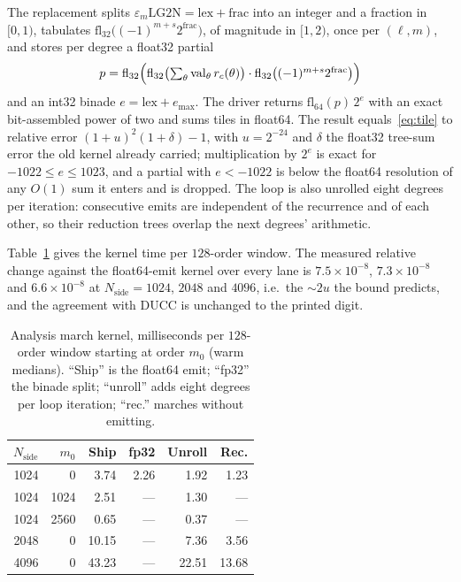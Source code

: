\documentclass[usenatbib,useAMS]{mnras}
\begin{document}
The replacement splits $\varepsilon_m\mathrm{LG2N}=\mathrm{lex}+\mathrm{frac}$ into an integer and a fraction in $[0,1)$, tabulates $\mathrm{fl}_{32}\bigl((-1)^{m+s}2^{\mathrm{frac}}\bigr)$, of magnitude in $[1,2)$, once per $(\ell,m)$, and stores per degree a float32 partial
\begin{equation}
\label{eq:p}
p=\mathrm{fl}_{32}\Bigl(\mathrm{fl}_{32}\bigl(\textstyle\sum_\theta\mathrm{val}_\theta\,r_c(\theta)\bigr)\cdot\mathrm{fl}_{32}\bigl((-1)^{m+s}2^{\mathrm{frac}}\bigr)\Bigr)
\end{equation}
and an int32 binade $e=\mathrm{lex}+e_{\max}$. The driver returns $\mathrm{fl}_{64}(p)\,2^e$ with an exact bit-assembled power of two and sums tiles in float64. The result equals~\eqref{eq:tile} to relative error $(1+u)^2(1+\delta)-1$, with $u=2^{-24}$ and $\delta$ the float32 tree-sum error the old kernel already carried; multiplication by $2^e$ is exact for $-1022\le e\le1023$, and a partial with $e<-1022$ is below the float64 resolution of any $O(1)$ sum it enters and is dropped. The loop is also unrolled eight degrees per iteration: consecutive emits are independent of the recurrence and of each other, so their reduction trees overlap the next degrees' arithmetic.

Table~\ref{tab:emit} gives the kernel time per $128$-order window. The measured relative change against the float64-emit kernel over every lane is $7.5\times10^{-8}$, $7.3\times10^{-8}$ and $6.6\times10^{-8}$ at $N_{\mathrm{side}}=1024$, $2048$ and $4096$, i.e.\ the $\sim2u$ the bound predicts, and the agreement with DUCC is unchanged to the printed digit.

\begin{table}
\centering
\caption{Analysis march kernel, milliseconds per $128$-order window starting at order $m_0$ (warm medians). ``Ship'' is the float64 emit; ``fp32'' the binade split; ``unroll'' adds eight degrees per loop iteration; ``rec.'' marches without emitting.}
\label{tab:emit}
\small
\begin{tabular}{@{}rrrrrr@{}}
\toprule
$N_{\mathrm{side}}$ & $m_0$ & Ship & fp32 & Unroll & Rec. \\
\midrule
1024 & 0    & 3.74  & 2.26 & 1.92  & 1.23  \\
1024 & 1024 & 2.51  & ---  & 1.30  & ---   \\
1024 & 2560 & 0.65  & ---  & 0.37  & ---   \\
2048 & 0    & 10.15 & ---  & 7.36  & 3.56  \\
4096 & 0    & 43.23 & ---  & 22.51 & 13.68 \\
\bottomrule
\end{tabular}
\end{table}
\end{document}
